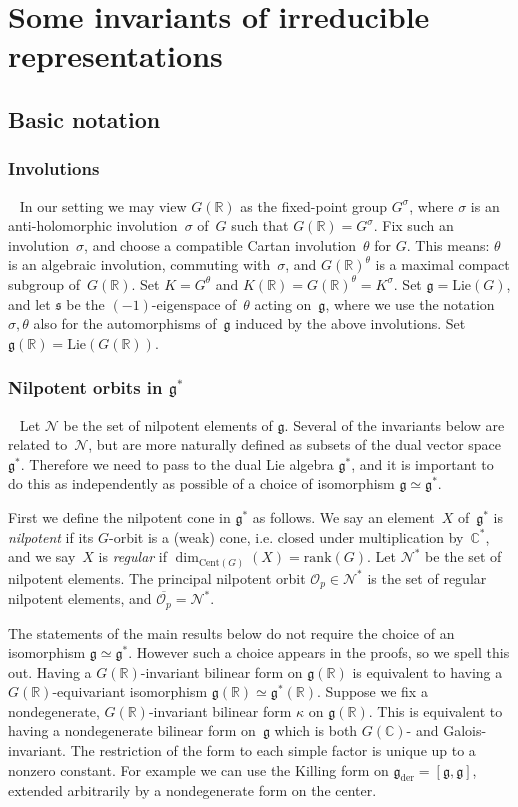 \documentclass[cupthm]{CUP-JNL-JMJ}
\numberwithin{equation}{section}
\theoremstyle{cupplain}
\theoremstyle{cupdefinition}
\theoremstyle{cupremark}
\theoremstyle{cupproof}
\newcommand{\Cent}{\mathrm{Cent}}
\renewcommand{\O}{\mathcal O}
\newcommand{\R}{\mathbb R}
\newcommand{\C}{\mathbb C}
\newcommand{\N}{\mathcal N}
\newcommand{\Lie}{\mathrm{Lie}}
\newcommand{\g}{\mathfrak g}
\newcommand{\gder}{\mathfrak g_{\mathrm{der}}}
\newcommand{\s}{\mathfrak s}
\begin{document}
\section{Some invariants of irreducible representations}

\subsection{Basic notation}

\subsubsection{Involutions}~
 In our setting we may view $G(\R)$ as the fixed-point group $G^\sigma$, where $\sigma$ is an anti-holomorphic involution~$\sigma$ of~$G$ such that $G(\R) = G^\sigma$. Fix such an involution~$\sigma$, and choose a compatible Cartan involution~$\theta$ for $G$. This means:
$\theta$ is an algebraic involution, commuting with~$\sigma$,
and $G(\R)^\theta$ is a maximal compact subgroup of~$G(\R)$. Set $K=G^\theta$ and $K(\R)=G(\R)^\theta=K^\sigma$.
Set $\g=\Lie(G)$, and let $\s$ be the $(-1)$-eigenspace of~$\theta$ acting on~$\g$, where we use the notation $\sigma, \theta$ also for the automorphisms of~$\g$ induced by the above involutions. Set $\g(\R)=\Lie(G(\R))$.

\subsubsection{Nilpotent orbits in $\g^*$}~
\label{s:dual}
Let $\N$ be the set of nilpotent elements of $\g$. Several of the invariants below are related to~$\N$, but are more naturally defined as subsets of the dual vector space~$\g^\ast$.
Therefore we need to pass to the dual Lie algebra $\g^*$, and it is important to do this as independently as possible of a choice
of isomorphism $\g\simeq\g^*$. 

First we define the nilpotent cone in $\g^*$ as follows. 
We say an element~$X$ of~$\g^*$ is \emph{nilpotent} if its $G$-orbit is a (weak) cone, i.e. closed under multiplication by~$\C^*$,
and we say~$X$ is \emph{regular} if $\dim_{\Cent(G)}(X)=\mathrm{rank}(G)$.
Let $\N^*$ be the set of nilpotent elements.
The principal nilpotent orbit $\O_p\in \N^*$ is the set of regular nilpotent elements, and $\overline{\O_p}=\N^*$.

The statements of the main results below do not require the choice of an isomorphism $\g\simeq \g^*$. However such a choice appears in the proofs, so we spell this out.
Having a $G(\R)$-invariant bilinear form on $\g(\R)$ is equivalent to having a $G(\R)$-equivariant isomorphism $\g(\R)\simeq \g^*(\R)$. 
Suppose we fix a nondegenerate, $G(\R)$-invariant bilinear form $\kappa$ on $\g(\R)$. This is equivalent to having a nondegenerate bilinear form on~$\g$ which is both $G(\C)$- and Galois-invariant. The restriction of the form to each simple factor
is unique up to a nonzero constant. For example we can use the Killing form on $\gder=[\g, \g]$, extended arbitrarily by a nondegenerate form on the center.
\end{document}
